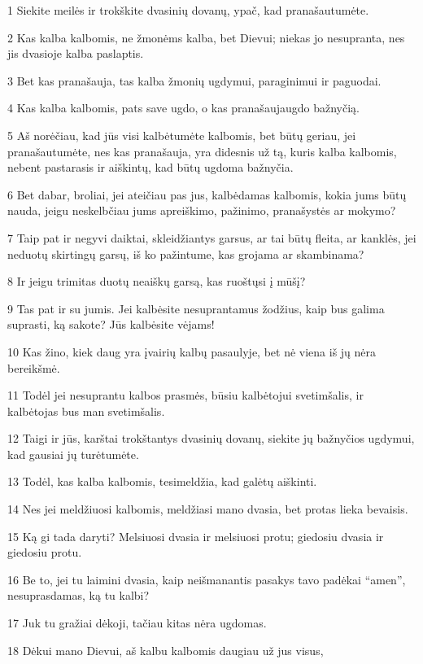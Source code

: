 \par 1 Siekite meilės ir trokškite dvasinių dovanų, ypač, kad pranašautumėte. 
\par 2 Kas kalba kalbomis, ne žmonėms kalba, bet Dievui; niekas jo nesupranta, nes jis dvasioje kalba paslaptis. 
\par 3 Bet kas pranašauja, tas kalba žmonių ugdymui, paraginimui ir paguodai. 
\par 4 Kas kalba kalbomis, pats save ugdo, o kas pranašauja­ugdo bažnyčią. 
\par 5 Aš norėčiau, kad jūs visi kalbėtumėte kalbomis, bet būtų geriau, jei pranašautumėte, nes kas pranašauja, yra didesnis už tą, kuris kalba kalbomis, nebent pastarasis ir aiškintų, kad būtų ugdoma bažnyčia. 
\par 6 Bet dabar, broliai, jei ateičiau pas jus, kalbėdamas kalbomis, kokia jums būtų nauda, jeigu neskelbčiau jums apreiškimo, pažinimo, pranašystės ar mokymo? 
\par 7 Taip pat ir negyvi daiktai, skleidžiantys garsus, ar tai būtų fleita, ar kanklės, jei neduotų skirtingų garsų, iš ko pažintume, kas grojama ar skambinama? 
\par 8 Ir jeigu trimitas duotų neaiškų garsą, kas ruoštųsi į mūšį? 
\par 9 Tas pat ir su jumis. Jei kalbėsite nesuprantamus žodžius, kaip bus galima suprasti, ką sakote? Jūs kalbėsite vėjams! 
\par 10 Kas žino, kiek daug yra įvairių kalbų pasaulyje, bet nė viena iš jų nėra bereikšmė. 
\par 11 Todėl jei nesuprantu kalbos prasmės, būsiu kalbėtojui svetimšalis, ir kalbėtojas bus man svetimšalis. 
\par 12 Taigi ir jūs, karštai trokštantys dvasinių dovanų, siekite jų bažnyčios ugdymui, kad gausiai jų turėtumėte. 
\par 13 Todėl, kas kalba kalbomis, tesimeldžia, kad galėtų aiškinti. 
\par 14 Nes jei meldžiuosi kalbomis, meldžiasi mano dvasia, bet protas lieka bevaisis. 
\par 15 Ką gi tada daryti? Melsiuosi dvasia ir melsiuosi protu; giedosiu dvasia ir giedosiu protu. 
\par 16 Be to, jei tu laimini dvasia, kaip neišmanantis pasakys tavo padėkai “amen”, nesuprasdamas, ką tu kalbi? 
\par 17 Juk tu gražiai dėkoji, tačiau kitas nėra ugdomas. 
\par 18 Dėkui mano Dievui, aš kalbu kalbomis daugiau už jus visus, 
